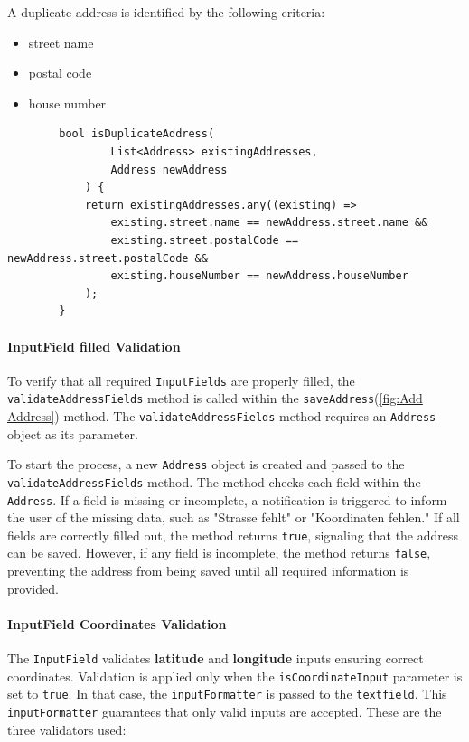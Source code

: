     A duplicate address is identified by the following criteria:
    \begin{itemize}
        \item street name
        \item postal code
        \item house number
    \end{itemize}

    \lstset{style=mycsharp, caption=isDuplicateAddress method}
    \begin{lstlisting}
        bool isDuplicateAddress(
                List<Address> existingAddresses,
                Address newAddress
            ) {
            return existingAddresses.any((existing) =>
                existing.street.name == newAddress.street.name &&
                existing.street.postalCode == newAddress.street.postalCode &&
                existing.houseNumber == newAddress.houseNumber
            );
        }
    \end{lstlisting}

\newpage

\paragraph{InputField filled Validation}
To verify that all required \texttt{InputFields} are properly filled, the \texttt{validateAddressFields} method is called within the \texttt{saveAddress}(\ref{fig:Add Address}) method. The \texttt{validateAddressFields} method requires an \texttt{Address} object as its parameter.

To start the process, a new \texttt{Address} object is created and passed to the \texttt{validateAddressFields} method. The method checks each field within the \texttt{Address}. If a field is missing or incomplete, a notification is triggered to inform the user of the missing data, such as "Strasse fehlt" or "Koordinaten fehlen." If all fields are correctly filled out, the method returns \texttt{true}, signaling that the address can be saved. However, if any field is incomplete, the method returns \texttt{false}, preventing the address from being saved until all required information is provided.



\paragraph{InputField Coordinates Validation}
\label{fig:InputField Coordinates Validation}
    The \texttt{InputField} validates \textbf{latitude} and \textbf{longitude} inputs ensuring correct coordinates. Validation is applied only when the \texttt{isCoordinateInput} parameter is set to \texttt{true}. In that case, the \texttt{inputFormatter} is passed to the \texttt{textfield}. This \texttt{inputFormatter} guarantees that only valid inputs are accepted. These are the three validators used:


